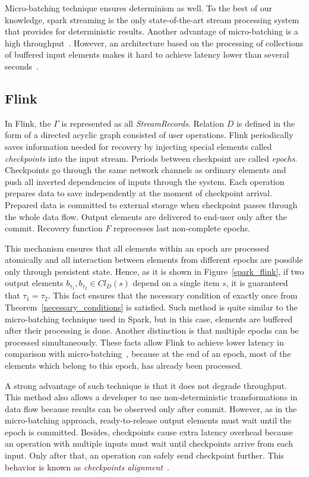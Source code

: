 Micro-batching technique ensures determinism as well. To the best of our knowledge, spark streaming is the only state-of-the-art stream processing system that provides for deterministic results. Another advantage of micro-batching is a high throughput~\cite{karimov2018benchmarking}. However, an architecture based on the processing of collections of buffered input elements makes it hard to achieve latency lower than several seconds~\cite{7530084, 7474816}. 

\subsection{Flink}

In Flink, the  $\Gamma$ is represented as all {\em StreamRecords}. Relation $D$ is defined in the form of a directed acyclic graph consisted of user operations. Flink periodically saves information needed for recovery by injecting special elements called {\em checkpoints} into the input stream. Periods between checkpoint are called {\em epochs}. Checkpoints go through the same network channels as ordinary elements and push all inverted dependencies of inputs through the system. Each operation prepares data to save independently at the moment of checkpoint arrival. Prepared data is committed to external storage when checkpoint passes through the whole data flow. Output elements are delivered to end-user only after the commit. Recovery function $F$ reprocesses last non-complete epochs.

This mechanism ensures that all elements within an epoch are processed atomically and all interaction between elements from different epochs are possible only through persistent state. Hence, as it is shown in Figure~\ref{spark_flink}, if two output elements $b_{\tau_1},b_{\tau_2} \in Cl_D(s)$ depend on a single item $s$, it is guaranteed that $\tau_1=\tau_2$. This fact ensures that the necessary condition of exactly once from Theorem~\ref{necessary_conditions} is satisfied. Such method is quite similar to the micro-batching technique used in Spark, but in this case, elements are buffered after their processing is done. Another distinction is that multiple epochs can be processed simultaneously. These facts allow Flink to achieve lower latency in comparison with micro-batching~\cite{karimov2018benchmarking}, because at the end of an epoch, most of the elements which belong to this epoch, has already been processed.

A strong advantage of such technique is that it does not degrade throughput. This method also allows a developer to use non-deterministic transformations in data flow because results can be observed only after commit. However, as in the micro-batching approach, ready-to-release output elements must wait until the epoch is committed.  Besides, checkpoints cause extra latency overhead because an operation with multiple inputs must wait until checkpoints arrive from each input. Only after that, an operation can safely send checkpoint further. This behavior is known as {\em checkpoints alignment}~\cite{Carbone:2017:SMA:3137765.3137777}.